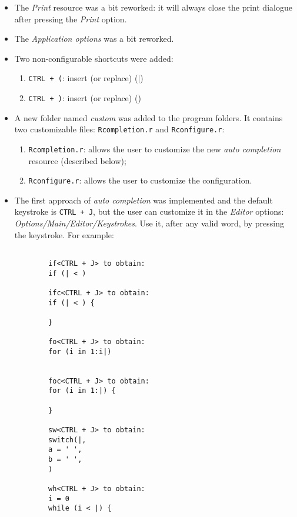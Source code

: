\begin{itemize}
  \item The \textit{Print} resource was a bit reworked: it will always close
    the print dialogue after pressing the \textit{Print} option.
  \item The \textit{Application options} was a bit reworked.
  \item Two non-configurable shortcuts were added:
    \begin{enumerate}
      \item \texttt{CTRL + (}: insert (or replace) ($|$)
      \item \texttt{CTRL + )}: insert (or replace) ()
    \end{enumerate}
  \item A new folder named \textit{custom} was added to the program folders.
    It contains two customizable files: \texttt{Rcompletion.r} and
    \texttt{Rconfigure.r}:
    \begin{enumerate}
      \item \texttt{Rcompletion.r}: allows the user to customize the new
        \textit{auto completion} resource (described below);
      \item \texttt{Rconfigure.r}: allows the user to customize the \RR{}
        configuration.
    \end{enumerate}
  \item The first approach of \textit{auto completion} was implemented and
    the default keystroke is \texttt{CTRL + J}, but the user can customize it
    in the \textit{Editor} options: \textit{Options/Main/Editor/Keystrokes}.
    Use it, after any valid word, by pressing the keystroke. For example:

    \begin{footnotesize}
      \begin{verbatim}

        if<CTRL + J> to obtain:
        if (| < )

        ifc<CTRL + J> to obtain:
        if (| < ) {

        }

        fo<CTRL + J> to obtain:
        for (i in 1:i|)


        foc<CTRL + J> to obtain:
        for (i in 1:|) {

        }

        sw<CTRL + J> to obtain:
        switch(|,
        a = ' ',
        b = ' ',
        )

        wh<CTRL + J> to obtain:
        i = 0
        while (i < |) {


\end{verbatim}
\end{footnotesize}
\end{itemize}
